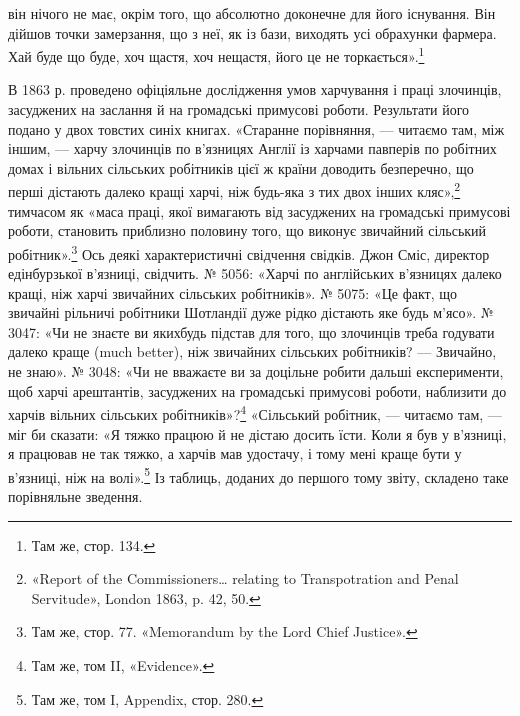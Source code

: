 \parcont{}  %
він нічого не має, окрім того, що абсолютно доконечне для його
існування. Він дійшов точки замерзання, що з неї, як із бази,
виходять усі обрахунки фармера. Хай буде що буде, хоч щастя,
хоч нещастя, його це не торкається».\footnote{
Там же, стор. 134.
}

В 1863 р. проведено офіціяльне дослідження умов харчування
і праці злочинців, засуджених на заслання й на громадські примусові
роботи. Результати його подано у двох товстих синіх
книгах. «Старанне порівняння, — читаємо там, між іншим, —
харчу злочинців по в’язницях Англії із харчами павперів по
робітних домах і вільних сільських робітників цієї ж країни
доводить безперечно, що перші дістають далеко кращі харчі,
ніж будь-яка з тих двох інших кляс»,\footnote{
«Report of the Commissioners\dots{} relating to Transpotration and
Penal Servitude», London 1863, p. 42, 50.
} тимчасом як «маса
праці, якої вимагають від засуджених на громадські примусові
роботи, становить приблизно половину того, що виконує звичайний
сільський робітник».\footnote{
Там же, стор. 77. «Memorandum by the Lord Chief Justice».
} Ось деякі характеристичні свідчення
свідків. Джон Сміс, директор едінбурзької в’язниці, свідчить.
№ 5056: «Харчі по англійських в’язницях далеко кращі, ніж
харчі звичайних сільських робітників». № 5075: «Це факт, що
звичайні рільничі робітники Шотландії дуже рідко дістають яке
будь м’ясо». № 3047: «Чи не знаєте ви якихбудь підстав для
того, що злочинців треба годувати далеко краще (much better),
ніж звичайних сільських робітників? — Звичайно, не знаю».
№ 3048: «Чи не вважаєте ви за доцільне робити дальші експерименти,
щоб харчі арештантів, засуджених на громадські примусові
роботи, наблизити до харчів вільних сільських робітників»?\footnote{
Там же, том II, «Evidence».
} «Сільський робітник, — читаємо там, — міг би сказати:
«Я тяжко працюю й не дістаю досить їсти. Коли я був у
в’язниці, я працював не так тяжко, а харчів мав удостачу, і тому
мені краще бути у в’язниці, ніж на волі».\footnote{
Там же, том I, Appendix, стор. 280.
} Із таблиць, доданих
до першого тому звіту, складено таке порівняльне зведення.

